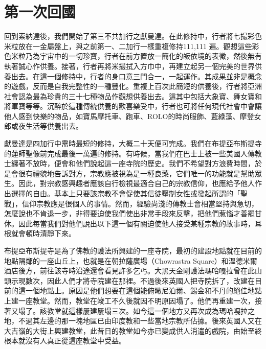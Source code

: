 \chapter{第一次回國}

回到索納達後，我們開始了第三不共加行之獻曼達。在此修持中，行者將七撮彩色米粒放在一金屬盤上，與之前第一、二加行一樣重複修持111,111
遍。觀想這些彩色米粒乃為宇宙中的一切珍寶，行者在前方置放一簡化的皈依境的表徵，然後無有執著誠心作供養。接著，行者再將米撮拭入方巾中，再建立起另一個完美的世界供養出去。在這一個修持中，行者的身口意三門合一，一起運作。其成果並非是概念的遊戲，反而是自我完整性的一種豐化。重複上百次此簡短的供養後，行者將亞洲社會認為最為珍貴的三十七種物品作觀想供養出去。這其中包括大象寶、舞女寶和將軍寶等等。沉醉於這種傳統供養的歡喜樂受中，行者也可將任何現代社會中會讓他人感到快樂的物品，如寶馬摩托車、跑車、ROLO的時尚服飾、藍綠藻、摩登女郎或夜生活等供養出去。



獻曼達是四加行中需時最短的修持，大概二十天便可完成。我們在布提亞布斯提寺的蓮師聖像前完成最後一萬遍的修持。有時候，當我們在巴士上被一些美國人傳教士纏著不放時，便會和他們說起這一座寺院的歷史。我們不希望對方浪費時間，於是會很有禮貌地告訴對方，宗教應被視為是一種良藥，它們唯一的功能就是幫助眾生。因此，對宗教感興趣者應該自行檢視最適合自己的宗教信仰，也應給予他人作出選擇的自由。基本上只要該宗教不會促使其信徒壓制女性或發起所謂的「聖戰」，信仰宗教應是很個人的事情。然而，經驗尚淺的傳教士會相當堅持與急切，怎麼說也不肯退一步，非得要迫使我們使出非常手段來反擊，把他們惹惱才善罷甘休。因此每當我們對他們說出以下這一個有關迫使他人接受某種宗教的故事時，耳根就會頓時清靜下來。

布提亞布斯提寺是為了佛教的護法所興建的一座寺院，最初的建設地點就在目前的地點隔鄰的一座山丘上，也就是在朝拉薩廣場（Chowrastra
Square）和溫德米爾酒店後方，前往該寺時沿途還會看見許多乞丐。大黑天金剛護法瑪哈嘎拉曾在此山頭示現數次，因此人們才將寺院建在那裡。不過後來英國人把寺院拆了，改建在目前的這一個地點上。原因是他們想要在這個能俯瞰尼泊爾、錫金和不丹的絕佳地點上建一座教堂。然而，教堂在竣工不久後就因不明原因塌了。他們再重建一次，接著又塌了。該教堂就這樣屢建屢塌三次。如今這一個地方又再次成為瑪哈嘎拉之地，不過其左邊的那一塊地區已由印度教和一些當地宗教所佔據。後來英國人又在大吉嶺的大街上興建教堂，此昔日的教堂如今亦已變成供人消遣的戲院，由始至終根本就沒有人真正從這座教堂中受益。

